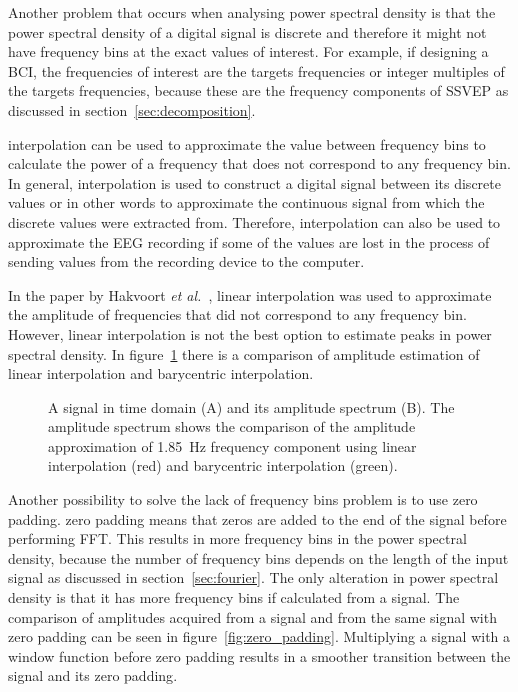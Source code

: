Another problem that occurs when analysing \gls{power spectral density} is that the \gls{power spectral density} of a \gls{digital signal} is discrete and therefore it might not have \glspl{frequency bin} at the exact values of interest. For example, if designing a \gls{BCI}, the frequencies of interest are the \glspl{target} frequencies or integer multiples of the \glspl{target} frequencies, because these are the \glspl{frequency component} of \gls{SSVEP} as discussed in section~\ref{sec:decomposition}.

\Gls{interpolation} can be used to approximate the value between \glspl{frequency bin} to calculate the power of a frequency that does not correspond to any \gls{frequency bin}. In general, \gls{interpolation} is used to construct a \gls{digital signal} between its discrete values or in other words to approximate the continuous signal from which the discrete values were extracted from. Therefore, \gls{interpolation} can also be used to approximate the \gls{EEG} recording if some of the values are lost in the process of sending values from the recording device to the computer.

In the paper by Hakvoort \textit{et al.}~\cite{cca_psda}, linear interpolation was used to approximate the amplitude of frequencies that did not correspond to any \gls{frequency bin}. However, linear interpolation is not the best option to estimate peaks in \gls{power spectral density}. In figure~\ref{fig:interpolation} there is a comparison of amplitude estimation of linear interpolation and barycentric interpolation.

\begin{figure}[h!]
	
	\caption{A signal in time domain (A) and its amplitude spectrum (B). The amplitude spectrum shows the comparison of the amplitude approximation of \SI{1.85}{Hz} frequency component using linear interpolation (red) and barycentric interpolation (green).}
	\label{fig:interpolation}
\end{figure}

Another possibility to solve the lack of \glspl{frequency bin} problem is to use \gls{zero padding}. \Gls{zero padding} means that zeros are added to the end of the signal before performing \gls{FFT}. This results in more \glspl{frequency bin} in the \gls{power spectral density}, because the number of \glspl{frequency bin} depends on the length of the input signal as discussed in section~\ref{sec:fourier}. The only alteration in \gls{power spectral density} is that it has more \glspl{frequency bin} if calculated from a  signal. The comparison of amplitudes acquired from a signal and from the same signal with \gls{zero padding} can be seen in figure~\ref{fig:zero_padding}. Multiplying a signal with a \gls{window} function before \gls{zero padding} results in a smoother transition between the signal and its \gls{zero padding}.

